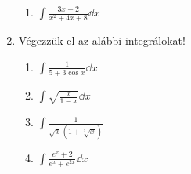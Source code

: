 \documentclass[a4paper, 12pt]{scrartcl}
\begin{document}
\begin{enumerate}
\begin{enumerate}
          \item $\displaystyle
                  \int \frac{3x - 2}{x^2 + 4x + 8} \dd x
                $
        \end{enumerate}

  \item Végezzük el az alábbi integrálokat!
        \begin{enumerate}
          \item $\displaystyle
                  \int \frac{1}{5 + 3 \cos x} \dd x
                $

          \item $\displaystyle
                  \int \sqrt{\frac{x}{1 - x}} \dd x
                $

          \item $\displaystyle
                  \int \frac{1}{\sqrt x (1 + \sqrt[3] x)}
                $

          \item $\displaystyle
                  \int \frac{e^x + 2}{e^x + e^{2x}} \dd x
                $
        \end{enumerate}
\end{enumerate}

\end{document}
